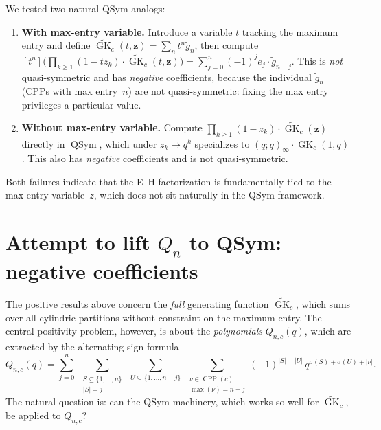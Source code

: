 \documentclass[11pt]{article}
\newcommand{\CPP}{\operatorname{CPP}}
\newcommand{\GK}{\operatorname{GK}}
\newcommand{\qpochn}[3]{(#1;#2)_{#3}}
\newcommand{\QSym}{\operatorname{QSym}}
\begin{document}
We tested two natural QSym analogs:
\begin{enumerate}
  \item \textbf{With max-entry variable.} Introduce a variable $t$
    tracking the maximum entry and define
    $\widetilde{\GK}_c(t, \mathbf{z}) = \sum_n t^n \tilde{g}_n$,
    then compute $[t^n]\bigl(\prod_{k \geq 1}(1 - tz_k) \cdot
    \widetilde{\GK}_c(t, \mathbf{z})\bigr)
    = \sum_{j=0}^n (-1)^j e_j \cdot \tilde{g}_{n-j}$.
    This is \emph{not} quasi-symmetric and has \emph{negative}
    coefficients, because the individual
    $\tilde{g}_n$ (CPPs with max entry~$n$) are not quasi-symmetric:
    fixing the max entry privileges a particular value.

  \item \textbf{Without max-entry variable.} Compute
    $\prod_{k \geq 1}(1 - z_k) \cdot \widetilde{\GK}_c(\mathbf{z})$
    directly in $\QSym$, which under $z_k \mapsto q^k$
    specializes to $\qpochn{q}{q}{\infty} \cdot \GK_c(1,q)$.
    This also has \emph{negative} coefficients
    and is not quasi-symmetric.
\end{enumerate}

Both failures indicate that the E--H factorization is
fundamentally tied to the max-entry variable~$z$, which does
not sit naturally in the QSym framework.

\section{Attempt to lift $Q_n$ to QSym: negative coefficients}
\label{sec:Qn-lift}

The positive results above concern the \emph{full} generating function
$\widetilde{\GK}_c$, which sums over all cylindric partitions without
constraint on the maximum entry. The central positivity problem,
however, is about the \emph{polynomials} $Q_{n,c}(q)$, which are
extracted by the alternating-sign formula
\begin{equation}\label{eq:Q-ground-set}
  Q_{n,c}(q) = \sum_{j=0}^{n}\;
  \sum_{\substack{S \subseteq \{1,\ldots,n\} \\ |S|=j}}\;
  \sum_{U \subseteq \{1,\ldots,n-j\}}\;
  \sum_{\substack{\nu \in \CPP(c) \\ \max(\nu) = n-j}}
  (-1)^{|S|+|U|}\, q^{\sigma(S)+\sigma(U)+|\nu|}.
\end{equation}
The natural question is: can the QSym machinery, which works so well for
$\widetilde{\GK}_c$, be applied to $Q_{n,c}$?
\end{document}
